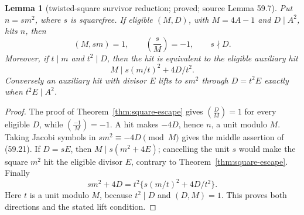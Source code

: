 \documentclass[10pt,reqno]{amsart}
\newtheorem{lemma}[theorem]{Lemma}
\theoremstyle{definition}
\newcommand{\1}{\mathbf 1}
\begin{document}
\begin{lemma}[twisted-square survivor reduction; proved; source Lemma 59.7]
\label{lem:twisted-square}
Put $n=sm^2$, where $s$ is squarefree.  If eligible $(M,D)$, with
$M=4A-1$ and $D\mid A^2$, hits $n$, then
\begin{equation}\tag{59.21}
 (M,sm)=1,\qquad \left(\frac{s}{M}\right)=-1,
 \qquad s\nmid D.
\end{equation}
Moreover, if $t\mid m$ and $t^2\mid D$, then the hit is equivalent to the
eligible auxiliary hit
\begin{equation}\tag{59.22}
 M\mid s(m/t)^2+4D/t^2.
\end{equation}
Conversely an auxiliary hit with divisor $E$ lifts to $sm^2$ through
$D=t^2E$ exactly when $t^2E\mid A^2$.
\end{lemma}
\begin{proof}
The proof of Theorem~\ref{thm:square-escape} gives
$\left(\frac{D}{M}\right)=1$ for every eligible $D$, while
$\left(\frac{-1}{M}\right)=-1$.  A hit makes $-4D$, hence $n$, a unit
modulo $M$.  Taking Jacobi symbols in $sm^2\equiv-4D\pmod M$ gives the
middle assertion of (59.21).  If $D=sE$, then
$M\mid s(m^2+4E)$; cancelling the unit $s$ would make the square $m^2$ hit
the eligible divisor $E$, contrary to Theorem~\ref{thm:square-escape}.
Finally
\[
 sm^2+4D=t^2\{s(m/t)^2+4D/t^2\}.
\]
Here $t$ is a unit modulo $M$, because $t^2\mid D$ and $(D,M)=1$.  This
proves both directions and the stated lift condition.
\end{proof}
\end{document}
